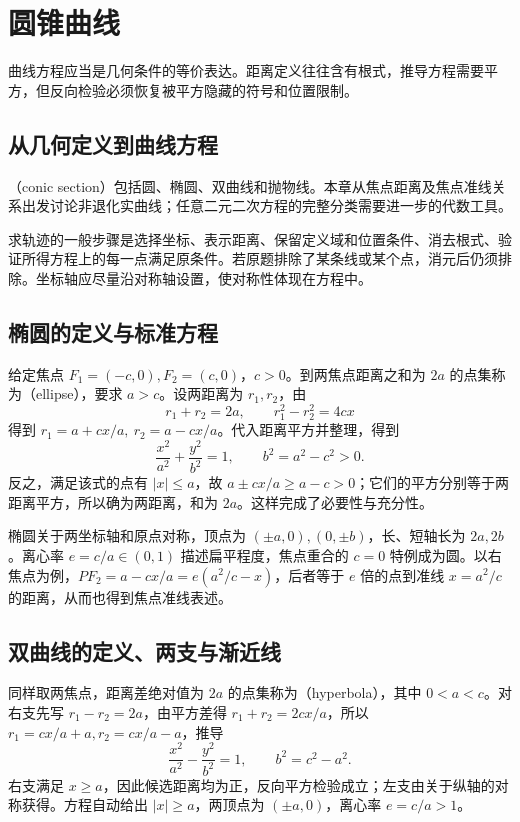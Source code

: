 \documentclass[UTF8]{ctexbook}
\begin{document}
\chapter{圆锥曲线}
\label{chap:em-conics}
曲线方程应当是几何条件的等价表达。距离定义往往含有根式，推导方程需要平方，但反向检验必须恢复被平方隐藏的符号和位置限制。

\section{从几何定义到曲线方程}
（conic section）包括圆、椭圆、双曲线和抛物线。本章从焦点距离及焦点准线关系出发讨论非退化实曲线；任意二元二次方程的完整分类需要进一步的代数工具。

求轨迹的一般步骤是选择坐标、表示距离、保留定义域和位置条件、消去根式、验证所得方程上的每一点满足原条件。若原题排除了某条线或某个点，消元后仍须排除。坐标轴应尽量沿对称轴设置，使对称性体现在方程中。

\section{椭圆的定义与标准方程}
给定焦点 $F_1=(-c,0),F_2=(c,0)$，$c>0$。到两焦点距离之和为 $2a$ 的点集称为（ellipse），要求 $a>c$。设两距离为 $r_1,r_2$，由
\[
 r_1+r_2=2a,\qquad r_1^2-r_2^2=4cx
\]
得到 $r_1=a+cx/a,\ r_2=a-cx/a$。代入距离平方并整理，得到
\begin{equation}\label{eq:em-ellipse}
 \frac{x^2}{a^2}+\frac{y^2}{b^2}=1,\qquad b^2=a^2-c^2>0.
\end{equation}
反之，满足该式的点有 $|x|\le a$，故 $a\pm cx/a\ge a-c>0$；它们的平方分别等于两距离平方，所以确为两距离，和为 $2a$。这样完成了必要性与充分性。

椭圆关于两坐标轴和原点对称，顶点为 $(\pm a,0),(0,\pm b)$，长、短轴长为 $2a,2b$。离心率 $e=c/a\in(0,1)$ 描述扁平程度，焦点重合的 $c=0$ 特例成为圆。以右焦点为例，$PF_2=a-cx/a=e(a^2/c-x)$，后者等于 $e$ 倍的点到准线 $x=a^2/c$ 的距离，从而也得到焦点准线表述。

\section{双曲线的定义、两支与渐近线}
同样取两焦点，距离差绝对值为 $2a$ 的点集称为（hyperbola），其中 $0<a<c$。对右支先写 $r_1-r_2=2a$，由平方差得 $r_1+r_2=2cx/a$，所以 $r_1=cx/a+a,r_2=cx/a-a$，推导
\begin{equation}\label{eq:em-hyperbola}
 \frac{x^2}{a^2}-\frac{y^2}{b^2}=1,\qquad b^2=c^2-a^2.
\end{equation}
右支满足 $x\ge a$，因此候选距离均为正，反向平方检验成立；左支由关于纵轴的对称获得。方程自动给出 $|x|\ge a$，两顶点为 $(\pm a,0)$，离心率 $e=c/a>1$。
\end{document}
